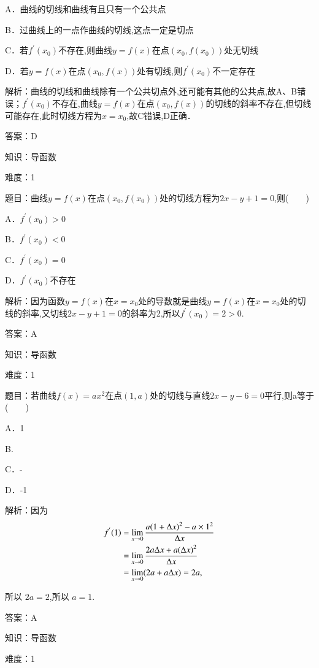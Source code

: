 \documentclass{article} %
\begin{document}
A．曲线的切线和曲线有且只有一个公共点

B．过曲线上的一点作曲线的切线,这点一定是切点

C．若$f^{'}(x_{0})$不存在,则曲线$y=f(x)$在点$(x_{0},f(x_{0}))$处无切线

D．若$y=f(x)$在点$(x_{0},f(x))$处有切线,则$f^{'}(x_{0})$不一定存在

解析：曲线的切线和曲线除有一个公共切点外,还可能有其他的公共点,故A、B错误；$f^{'}(x_{0})$不存在,曲线$y=f(x)$在点$(x_{0},f(x))$的切线的斜率不存在,但切线可能存在,此时切线方程为$x=x_{0}$,故C错误,D正确．

答案：D



知识：导函数

难度：1

题目：曲线$y=f(x)$在点$(x_{0},f(x_{0}))$处的切线方程为$2x-y+1=0$,则(　　)

A．$f^{'}(x_{0}){>}0$　　　　　 

B．$f^{'}(x_{0}){<}0$

C．$f^{'}(x_{0})=0$  

D．$f^{'}(x_{0})$不存在

解析：因为函数$y=f(x)$在$x=x_{0}$处的导数就是曲线$y=f(x)$在$x=x_{0}$处的切线的斜率,又切线$2x-y+1=0$的斜率为2,所以$f^{'}(x_{0})=2{>}0$.

答案：A



知识：导函数

难度：1

题目：若曲线$f(x)=ax^{2}$在点$(1,a)$处的切线与直线$2x-y-6=0$平行,则a等于(　　)

A．1  

B.  

C．-  

D．-1

解析：因为
\begin{align}
\notag
f^{'}(1)
&=\lim\limits_{x\rightarrow 0}\frac{a{(1+\Delta x)}^2-a\times 1^2}{\Delta x}\\\notag
&=\lim\limits_{x \rightarrow 0}\frac{2a\Delta x + a{(\Delta x)}^2}{\Delta x}\\\notag
&=\lim\limits_{x \rightarrow 0}(2a+a\Delta x)=2a,
\end{align}


所以 $2a=2$,所以 $a=1$.

答案：A



知识：导函数

难度：1
\end{document}

